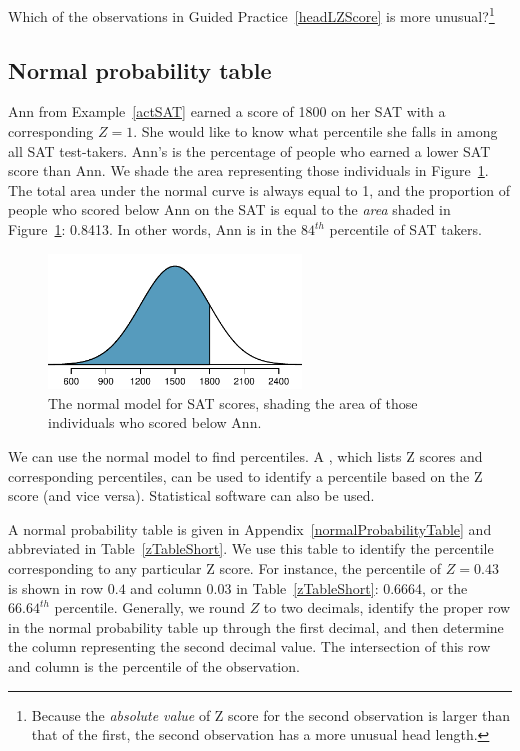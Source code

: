 \begin{exercise}
Which of the observations in Guided Practice~\ref{headLZScore} is more \mbox{unusual}?\footnote{Because the \emph{absolute value} of Z score for the second observation is larger than that of the first, the second observation has a more unusual head length.}
\end{exercise}


\subsection{Normal probability table}

\begin{example}{Ann from Example~\ref{actSAT} earned a score of 1800 on her SAT with a corresponding $Z=1$. She would like to know what percentile she falls in among all SAT test-takers.}
Ann's  is the percentage of people who earned a lower SAT score than Ann. We shade the area representing those individuals in Figure~\ref{satBelow1800}. The total area under the normal curve is always equal to 1, and the proportion of people who scored below Ann on the SAT is equal to the \emph{area} shaded in Figure~\ref{satBelow1800}: 0.8413. In other words, Ann is in the $84^{th}$ percentile of SAT takers.
\end{example}

\begin{figure}[htb]
   \centering
   \includegraphics[width=0.6\textwidth]{02/figures/satBelow1800/satBelow1800}
   \caption{The normal model for SAT scores, shading the area of those individuals who scored below Ann.}
   \label{satBelow1800}
\end{figure}

We can use the normal model to find percentiles. A , which lists Z scores and corresponding percentiles, can be used to identify a percentile based on the Z score (and vice versa). Statistical software can also be used.

A normal probability table is given in Appendix~\vref{normalProbabilityTable} and abbreviated in Table~\ref{zTableShort}. We use this table to identify the percentile corresponding to any particular Z score. For instance, the percentile of $Z=0.43$ is shown in row $0.4$ and column $0.03$ in Table~\ref{zTableShort}: 0.6664, or the $66.64^{th}$ percentile. Generally, we round $Z$ to two decimals, identify the proper row in the normal probability table up through the first decimal, and then determine the column representing the second decimal value. The intersection of this row and column is the percentile of the observation.

